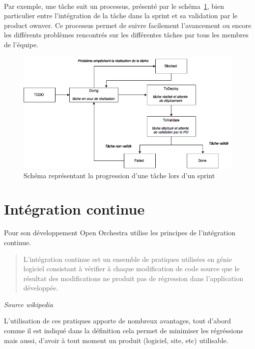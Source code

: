 \paragraph{}
Par exemple, une tâche suit un processus, présenté par le schéma~\ref{tache_trello}, bien particulier entre l'intégration de la tâche dans la sprint et sa validation par le product ownver. Ce processus permet de suivre facilement l'avancement ou encore les différents problèmes rencontrés sur les différentes tâches par tous les membres de l'équipe.

\begin{figure}[H]
  \begin{center}
    \includegraphics[scale=0.70]{images/tache_trello}
  \end{center}
  \caption{Schéma représentant la progression d'une tâche lors d'un sprint}
  \label{tache_trello}
\end{figure}
\section{Intégration continue}
Pour son développement Open Orchestra utilise les principes de l'intégration continue. 
\newline
\begin{quotation}
L'intégration continue est un ensemble de pratiques utilisées en génie logiciel consistant à vérifier à chaque modification de code source que le résultat des modifications ne produit pas de régression dans l'application développée.
\end{quotation}
\textit{Source wikipedia}

L'utilisation de ces pratiques apporte de nombreux avantages, tout d'abord comme il est indiqué dans la définition cela permet de minimiser les régréssions mais aussi, d'avoir à tout moment un produit (logiciel, site, etc) utilisable.
